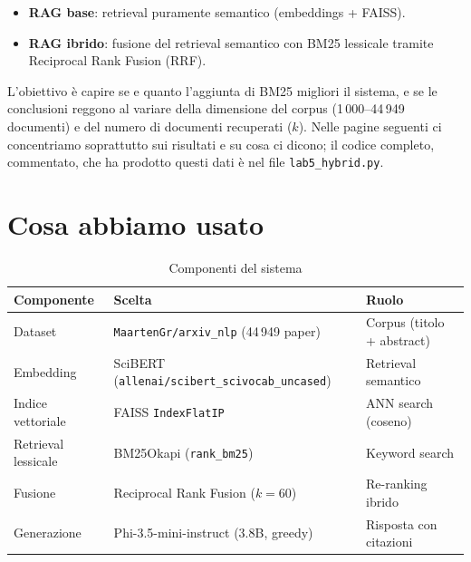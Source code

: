 \documentclass[12pt,a4paper]{article}
\begin{document}
\begin{itemize}
  \item \textbf{RAG base}: retrieval puramente semantico (embeddings + FAISS).
  \item \textbf{RAG ibrido}: fusione del retrieval semantico con BM25 lessicale tramite Reciprocal Rank Fusion (RRF).
\end{itemize}

L'obiettivo \`e capire se e quanto l'aggiunta di BM25 migliori il sistema, e se le conclusioni reggono al variare della dimensione del corpus (1\,000--44\,949 documenti) e del numero di documenti recuperati ($k$). Nelle pagine seguenti ci concentriamo soprattutto sui risultati e su cosa ci dicono; il codice completo, commentato, che ha prodotto questi dati \`e nel file \texttt{lab5\_hybrid.py}.

\section{Cosa abbiamo usato}

\begin{table}[H]
  \centering
  \caption{Componenti del sistema}
  \begin{tabular}{lll}
    \toprule
    \textbf{Componente}    & \textbf{Scelta}                                & \textbf{Ruolo} \\
    \midrule
    Dataset                & \texttt{MaartenGr/arxiv\_nlp} (44\,949 paper)  & Corpus (titolo + abstract) \\
    Embedding              & SciBERT (\texttt{allenai/scibert\_scivocab\_uncased}) & Retrieval semantico \\
    Indice vettoriale      & FAISS \texttt{IndexFlatIP}                     & ANN search (coseno) \\
    Retrieval lessicale    & BM25Okapi (\texttt{rank\_bm25})                & Keyword search \\
    Fusione                & Reciprocal Rank Fusion ($k=60$)                & Re-ranking ibrido \\
    Generazione            & Phi-3.5-mini-instruct (3.8B, greedy)           & Risposta con citazioni \\
    \bottomrule
  \end{tabular}
\end{table}
\end{document}
